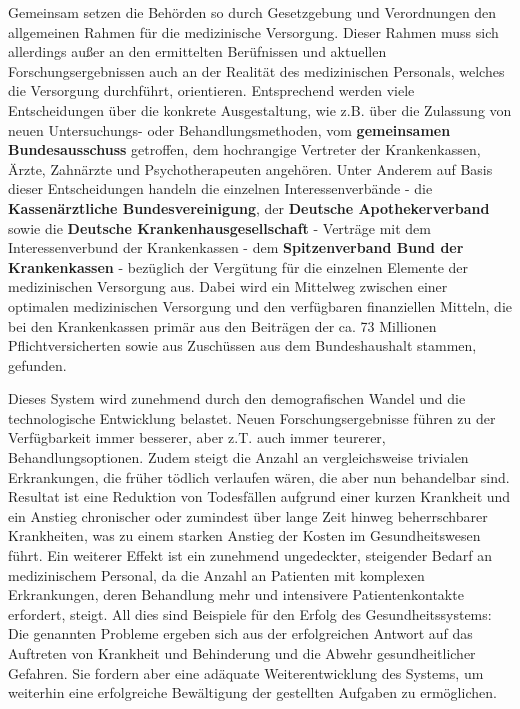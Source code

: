 Gemeinsam setzen die Behörden so durch Gesetzgebung und Verordnungen den allgemeinen Rahmen für die medizinische Versorgung. Dieser Rahmen muss sich allerdings außer an den ermittelten Berüfnissen und aktuellen Forschungsergebnissen auch an der Realität des medizinischen Personals, welches die Versorgung durchführt, orientieren. Entsprechend werden viele Entscheidungen über die konkrete Ausgestaltung, wie z.B. über die Zulassung von neuen Untersuchungs- oder Behandlungsmethoden, vom \textbf{gemeinsamen Bundesausschuss} getroffen, dem hochrangige Vertreter der Krankenkassen, Ärzte, Zahnärzte und Psychotherapeuten angehören. Unter Anderem auf Basis dieser Entscheidungen handeln die einzelnen Interessenverbände - die \textbf{Kassenärztliche Bundesvereinigung}, der \textbf{Deutsche Apothekerverband} sowie die \textbf{Deutsche Krankenhausgesellschaft} - Verträge mit dem Interessenverbund der Krankenkassen - dem \textbf{Spitzenverband Bund der Krankenkassen} - bezüglich der Vergütung für die einzelnen Elemente der medizinischen Versorgung aus. Dabei wird ein Mittelweg zwischen einer optimalen medizinischen Versorgung und den verfügbaren finanziellen Mitteln, die bei den Krankenkassen primär aus den Beiträgen der ca. 73 Millionen Pflichtversicherten sowie aus Zuschüssen aus dem Bundeshaushalt stammen, gefunden. 

Dieses System wird zunehmend durch den demografischen Wandel und die technologische Entwicklung belastet. Neuen Forschungsergebnisse führen zu der Verfügbarkeit immer besserer, aber z.T. auch immer teurerer, Behandlungsoptionen. Zudem steigt die Anzahl an vergleichsweise trivialen Erkrankungen, die früher tödlich verlaufen wären, die aber nun behandelbar sind. Resultat ist eine Reduktion von Todesfällen aufgrund einer kurzen Krankheit und ein Anstieg chronischer oder zumindest über lange Zeit hinweg beherrschbarer Krankheiten, was zu einem starken Anstieg der Kosten im Gesundheitswesen führt. Ein weiterer Effekt ist ein zunehmend ungedeckter, steigender Bedarf an medizinischem Personal, da die Anzahl an Patienten mit komplexen Erkrankungen, deren Behandlung mehr und intensivere Patientenkontakte erfordert, steigt. All dies sind Beispiele für den Erfolg des Gesundheitssystems: Die genannten Probleme ergeben sich aus der erfolgreichen Antwort auf das Auftreten von Krankheit und Behinderung und die Abwehr gesundheitlicher Gefahren. Sie fordern aber eine adäquate Weiterentwicklung des Systems, um weiterhin eine erfolgreiche Bewältigung der gestellten Aufgaben zu ermöglichen.

